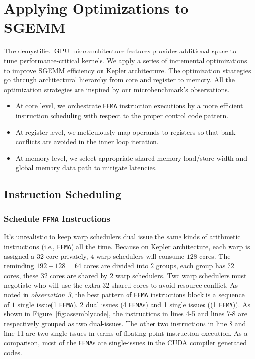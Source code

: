 \section{Applying Optimizations to SGEMM}
\label{sec:optimization}
The demystified GPU microarchitecture features provides additional space to tune performance-critical kernels. We apply a series of incremental optimizations to improve SGEMM efficiency on Kepler architecture. The optimization strategies go through architectural hierarchy from core and register to memory. All the optimization strategies are inspired by our microbenchmark's observations.
\begin{itemize}
\item At core level, we orchestrate {\tt FFMA} instruction executions by a more efficient instruction scheduling with respect to the proper control code pattern.
\item At register level, we meticulously map operands to registers so that bank conflicts are avoided in the inner loop iteration.
\item At memory level, we select appropriate shared memory load/store width and global memory data path to mitigate latencies.
\end{itemize}

\subsection{Instruction Scheduling}
\subsubsection{Schedule {\tt FFMA} Instructions}
It's unrealistic to keep warp schedulers dual issue the same kinds of arithmetic instructions (i.e., {\tt FFMA}) all the time. Because on Kepler architecture, each warp is assigned a $32$ core privately, $4$ warp schedulers will consume $128$ cores. The reminding $192-128=64$ cores are divided into $2$ groups, each group has $32$ cores, these $32$ cores are shared by $2$ warp schedulers. Two warp schedulers must negotiate who will use the extra $32$ shared cores to avoid resource conflict.
As noted in {\em observation 3}, the best pattern of {\tt FFMA} instructions block is a sequence of $1$ single issue(1 {\tt FFMA}), 2 dual issues (4 {\tt FFMA}s) and 1 single issues ((1 {\tt FFMA})). As shown in Figure~\ref{fig:assemblycode}, the instructions in lines 4-5 and lines 7-8 are respectively grouped as two dual-issues. The other two instructions in line 8 and line 11 are two single issues in terms of floating-point instruction execution. As a comparison, most of the {\tt FFMA}s are single-issues in the CUDA compiler generated codes.

